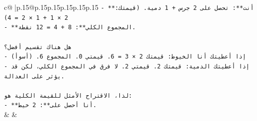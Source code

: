 \documentclass{article}
\begin{document}
{\begin{supertabular}{c@{$\;$}|p{.15\linewidth}@{}p{.15\linewidth}p{.15\linewidth}p{.15\linewidth}p{.15\linewidth}p{.15\linewidth}}
{{{\texttt{{-} **أنت**: تحصل على 2 جرس + 1 دمية. (قيمتك: 2 × 1 + 1 × 2 = 4)} \\
\texttt{{-} **المجموع الكلي**: 8 + 4 = 12 نقطة.} \\
\\ 
\texttt{هل هناك تقسيم أفضل؟} \\
\texttt{{-} إذا أعطيتك أنا الخيوط: قيمتك 2 × 3 = 6. قيمتي 0. المجموع 6. (أسوأ)} \\
\texttt{{-} إذا أعطيتك الدمية: قيمتك 2. قيمتي 2. لا فرق في المجموع الكلي، لكن قد يؤثر على العدالة.} \\
\\ 
\texttt{لذا، الاقتراح الأمثل للقيمة الكلية هو:} \\
\texttt{{-} **أنا أحصل على**: 2 خيط.} \\
            }
        }
    }
    & & \\ \\


\end{supertabular}}
\end{document}
